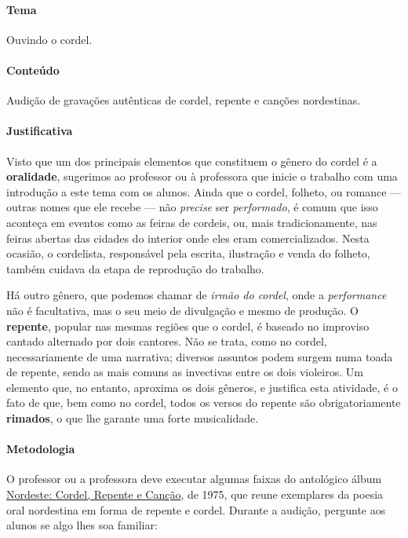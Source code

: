 \documentclass[11pt]{extarticle}
\begin{document}
\paragraph{Tema} Ouvindo o cordel.

\paragraph{Conteúdo} Audição de gravações autênticas de cordel, repente e canções
nordestinas.

\paragraph{Justificativa} Visto que um dos principais elementos que constituem o gênero do cordel é a 
\textbf{oralidade}, sugerimos ao professor ou à professora que inicie o 
trabalho com uma introdução a este tema com os alunos. 
Ainda que o cordel, folheto, ou romance --- outras nomes que ele recebe --- 
não \textit{precise} ser \textit{performado}, é comum que isso aconteça
em eventos como as feiras de cordeis, ou, mais tradicionamente, 
nas feiras abertas das cidades do interior onde eles eram comercializados.
Nesta ocasião, o cordelista, responsável pela escrita, ilustração e venda
do folheto, também cuidava da etapa de reprodução do trabalho.

Há outro gênero, que podemos chamar de \textit{irmão do cordel},
onde a \textit{performance} não é facultativa, mas o seu meio de 
divulgação e mesmo de produção. 
O \textbf{repente}, popular nas mesmas regiões que o cordel, é 
baseado no improviso cantado alternado por dois cantores. 
Não se trata, como no cordel, necessariamente de uma narrativa;
diversos assuntos podem surgem numa toada de repente, sendo as mais comuns
as invectivas entre os dois violeiros. 
Um elemento que, no entanto, aproxima os dois gêneros, e justifica esta atividade,
é o fato de que, bem como no cordel, todos os versos do repente são
obrigatoriamente \textbf{rimados}, o que lhe garante uma forte musicalidade. 

\paragraph{Metodologia} O professor ou a professora deve executar algumas faixas 
do antológico álbum \href{https://www.youtube.com/watch?v=wS6jzcZcc6U}{Nordeste: Cordel, 
Repente e Canção}, de 1975, que
reune exemplares da poesia oral nordestina em forma de repente e cordel. 
Durante a audição, pergunte aos alunos se algo lhes soa familiar:
\end{document}
